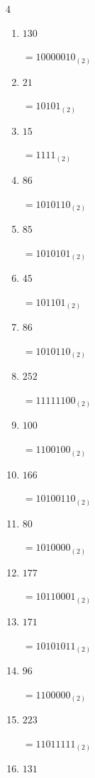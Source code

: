 \begin{multicols}{4}
\begin{enumerate}
        $=10101011_{(2)}$

  \item $130$

        $=10000010_{(2)}$

  \item $21$

        $=10101_{(2)}$

  \item $15$

        $=1111_{(2)}$

  \item $86$

        $=1010110_{(2)}$

  \item $85$

        $=1010101_{(2)}$

  \item $45$

        $=101101_{(2)}$

\columnbreak %

  \item $86$

        $=1010110_{(2)}$

  \item $252$

        $=11111100_{(2)}$

  \item $100$

        $=1100100_{(2)}$

  \item $166$

        $=10100110_{(2)}$

  \item $80$

        $=1010000_{(2)}$

  \item $177$

        $=10110001_{(2)}$

  \item $171$

        $=10101011_{(2)}$

  \item $96$

        $=1100000_{(2)}$

  \item $223$

        $=11011111_{(2)}$

  \item $131$


\end{enumerate}
\end{multicols}
